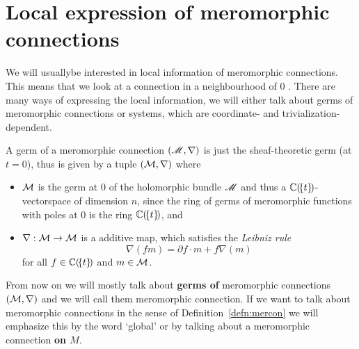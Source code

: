 \section{Local expression of meromorphic connections}
We will usually\TODO[only?] be interested in local information of meromorphic
connections.  This means that we look at a connection in a neighbourhood of $0$
.
There are many ways of expressing the local information, we will either talk
about germs of meromorphic connections or systems, which are coordinate-
and trivialization-dependent.
\begin{prop}
  A germ of a meromorphic connection $(\mathscr{M},\nabla)$ is just the sheaf-theoretic
  germ (at $t=0$), thus is given by a tuple $(\mathcal{M},\nabla)$ where
  \begin{itemize}
    \item $\mathcal{M}$ is the germ at $0$ of the holomorphic bundle $\mathscr{M}$ and thus a
      $\mathbb{C}(\!\{t\}\!)$-vectorspace of dimension $n$, since the ring of germs of
      meromorphic functions with poles at $0$ is the ring $\mathbb{C}(\!\{t\}\!)$, and
    \item $\nabla:\mathcal{M}\to \mathcal{M}$  is a additive map, which
      satisfies the \emph{Leibniz rule}
      \[
        \nabla(fm)=\partial f\cdot m + f\nabla(m)
      \]
      for all $f\in\mathbb{C}(\!\{t\}\!)$ and $m\in \mathcal{M}$.
  \end{itemize}
  \begin{comment}
      \begin{s-rem}
      \marginnote{\cite{sabbah2007isomonodromic}}
      It is a $(\C(\!\{t\}\!),\nabla)$-vectorspace.
    \end{s-rem}
    \begin{s-rem}
      Loday-Richaud calls this in \cite[Def.4.2.1]{Loday2014} a
      \emph{differential module}.
    \end{s-rem}
  \end{comment}
\end{prop}
\begin{rem}
  From now on we will mostly talk about \textbf{germs of} meromorphic
  connections $(\mathcal{M},\nabla)$ and we will call them meromorphic connection. If
  we want to talk about meromorphic connections in the sense of
  Definition~\ref{defn:mercon} we will emphasize this by the word `global' or
  by talking about a meromorphic connection \textbf{on $M$}.
\end{rem}
